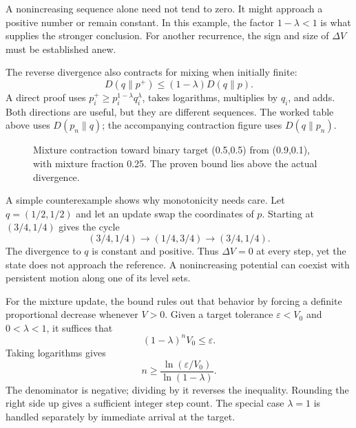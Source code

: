 \documentclass[11pt,oneside,openany]{book}
\theoremstyle{definition}
\theoremstyle{remark}
\numberwithin{equation}{chapter}
\begin{document}
A nonincreasing sequence alone need not tend to zero. It might approach a positive number or remain constant. In this example, the factor \(1-\lambda<1\) is what supplies the stronger conclusion. For another recurrence, the sign and size of \(\Delta V\) must be established anew.

The reverse divergence also contracts for mixing when initially finite: \[D(q\|p^+)\leq(1-\lambda)D(q\|p).\] A direct proof uses \(p_i^+\geq p_i^{1-\lambda}q_i^\lambda\), takes logarithms, multiplies by \(q_i\), and adds. Both directions are useful, but they are different sequences. The worked table above uses \(D(p_n\|q)\); the accompanying contraction figure uses \(D(q\|p_n)\).

\begin{figure}[htbp]\centering
{}
\caption{Mixture contraction toward binary target (0.5,0.5) from (0.9,0.1), with mixture fraction 0.25. The proven bound lies above the actual divergence.}\end{figure}

A simple counterexample shows why monotonicity needs care. Let \(q=(1/2,1/2)\) and let an update swap the coordinates of \(p\). Starting at \((3/4,1/4)\) gives the cycle \[(3/4,1/4)\to(1/4,3/4)\to(3/4,1/4).\] The divergence to \(q\) is constant and positive. Thus \(\Delta V=0\) at every step, yet the state does not approach the reference. A nonincreasing potential can coexist with persistent motion along one of its level sets.

For the mixture update, the bound rules out that behavior by forcing a definite proportional decrease whenever \(V>0\). Given a target tolerance \(\varepsilon<V_0\) and \(0<\lambda<1\), it suffices that \[(1-\lambda)^nV_0\leq\varepsilon.\] Taking logarithms gives \[n\geq\frac{\ln(\varepsilon/V_0)}{\ln(1-\lambda)}.\] The denominator is negative; dividing by it reverses the inequality. Rounding the right side up gives a sufficient integer step count. The special case \(\lambda=1\) is handled separately by immediate arrival at the target.
\end{document}
